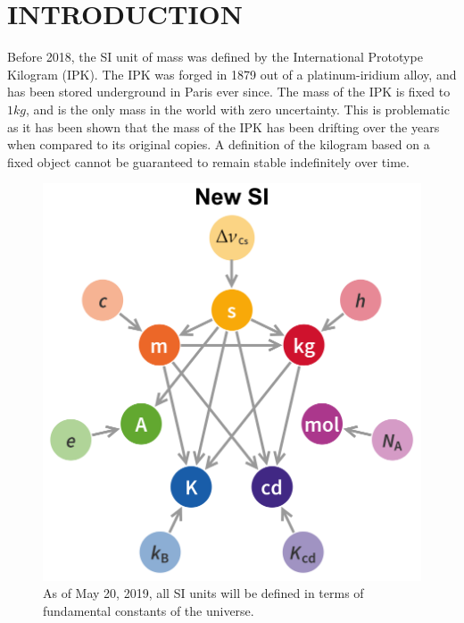 \documentclass[aps,prstab,reprint,12pt]{revtex4-1}
\begin{document}
\section{INTRODUCTION}

Before 2018, the SI unit of mass was defined by the International Prototype Kilogram (IPK). The IPK was forged in 1879 out of a platinum-iridium alloy, and has been stored underground in Paris ever since. The mass of the IPK is fixed to $1\si{kg}$, and is the only mass in the world with zero uncertainty. This is problematic as it has been shown that the mass of the IPK has been drifting over the years when compared to its original copies. A definition of the kilogram based on a fixed object cannot be guaranteed to remain stable indefinitely over time.

\begin{figure}[h]
    \centering\includegraphics[width=.95\linewidth]{figs/si_units.png}
    \caption{As of May 20, 2019, all SI units will be defined in terms of fundamental constants of the universe. 
    \cite{wiki_si}}\label{fig:si}
\end{figure}
\end{document}
